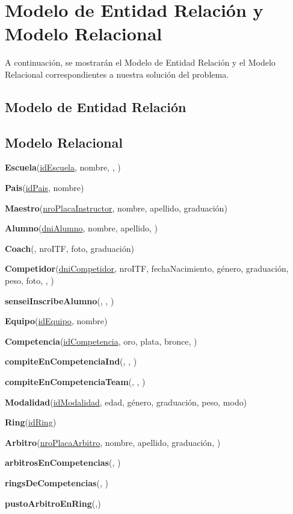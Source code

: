 \section{Modelo de Entidad Relación y Modelo Relacional}

A continuación, se mostrarán el Modelo de Entidad Relación y el Modelo Relacional correspondientes a nuestra solución del problema.

\subsection{Modelo de Entidad Relación}

\subsection{Modelo Relacional}

\textbf{Escuela}(\uline{idEscuela}, nombre, , )

\textbf{Pais}(\uline{idPais}, nombre)

\textbf{Maestro}(\uline{nroPlacaInstructor}, nombre, apellido, graduación)

\textbf{Alumno}(\uline{dniAlumno}, nombre, apellido, )

\textbf{Coach}(, nroITF, foto, graduación)

\textbf{Competidor}(\uline{dniCompetidor}, nroITF, fechaNacimiento, género, graduación, peso, foto, , )

\textbf{senseiInscribeAlumno}(, , )

\textbf{Equipo}(\uline{idEquipo}, nombre)

\textbf{Competencia}(\uline{idCompetencia}, oro, plata, bronce, )

\textbf{compiteEnCompetenciaInd}(, , )

\textbf{compiteEnCompetenciaTeam}(, , )

\textbf{Modalidad}(\uline{idModalidad}, edad, género, graduación, peso, modo)

\textbf{Ring}(\uline{idRing})

\textbf{Arbitro}(\uline{nroPlacaArbitro}, nombre, apellido, graduación, )

\textbf{arbitrosEnCompetencias}(, )

\textbf{ringsDeCompetencias}(, )

\textbf{pustoArbitroEnRing}(,)

